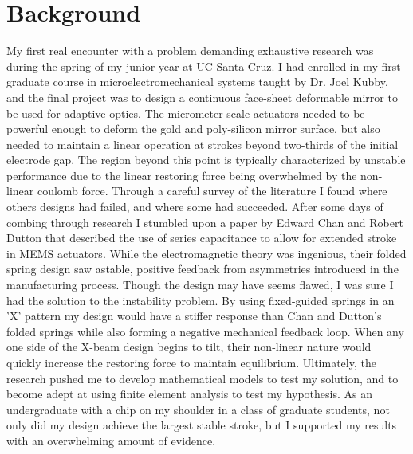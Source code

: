 \documentclass[journal, draftcls]{IEEEtran}
\begin{document}
\section{Background}
My first real encounter with a problem demanding exhaustive research was during the spring of my junior year at UC Santa Cruz. I had enrolled in my first graduate course in microelectromechanical systems taught by Dr. Joel Kubby, and the final project was to design a continuous face-sheet deformable mirror to be used for adaptive optics. The micrometer scale actuators needed to be powerful enough to deform the gold and poly-silicon mirror surface, but also needed to maintain a linear operation at strokes beyond two-thirds of the initial electrode gap. The region beyond this point is typically characterized by unstable performance due to the linear restoring force being overwhelmed by the non-linear coulomb force. Through a careful survey of the literature I found where others designs had failed, and where some had succeeded. After some days of combing through research I stumbled upon a paper by Edward Chan and Robert Dutton that described the use of series capacitance to allow for extended stroke in MEMS actuators. While the electromagnetic theory was ingenious, their folded spring design saw astable, positive feedback from asymmetries introduced in the manufacturing process. Though the design may have seems flawed, I was sure I had the solution to the instability problem. By using fixed-guided springs in an 'X' pattern my design would have a stiffer response than Chan and Dutton's folded springs while also forming a negative mechanical feedback loop. When any one side of the X-beam design begins to tilt, their non-linear nature would quickly increase the restoring force to maintain equilibrium. Ultimately, the research pushed me to develop mathematical models to test my solution, and to become adept at using finite element analysis to test my hypothesis. As an undergraduate with a chip on my shoulder in a class of graduate students, not only did my design achieve the largest stable stroke, but I supported my results with an overwhelming amount of evidence.  
\end{document}

